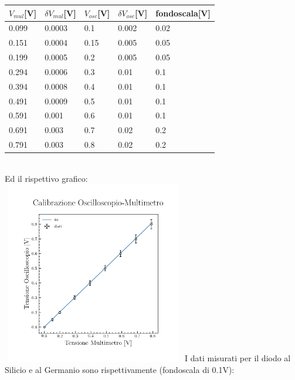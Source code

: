 \documentclass{article}
\begin{document}
    \begin{tabular}{|p{2cm}|p{2cm}|p{2cm}|p{2cm}|p{2cm}|}
        \hline
        $V_{mul}$[V] & $\delta V_{mul}$[V] & $V_{osc}$[V] & $\delta V_{osc}$[V] & fondoscala[V]\\
        \hline
        0.099 & 0.0003 & 0.1 & 0.002 & 0.02\\
        0.151 & 0.0004 & 0.15 & 0.005 & 0.05\\
        0.199 & 0.0005 & 0.2 & 0.005 & 0.05\\
        0.294 & 0.0006 & 0.3 & 0.01 & 0.1\\
        0.394 & 0.0008 & 0.4 & 0.01 & 0.1\\
        0.491 & 0.0009 & 0.5 & 0.01 & 0.1\\
        0.591 & 0.001 & 0.6 & 0.01 & 0.1\\
        0.691 & 0.003 & 0.7 & 0.02 & 0.2\\
        0.791 & 0.003 & 0.8 & 0.02 & 0.2\\
        \hline
    \end{tabular}\\
    Ed il rispettivo grafico:\\
    \includegraphics[width = 8cm, height = 8cm]{calibrazione/calibrazione.png}
    \newpage
    I dati misurati per il diodo al Silicio e al Germanio sono rispettivamente (fondoscala di 0.1V):\\
\end{document}
